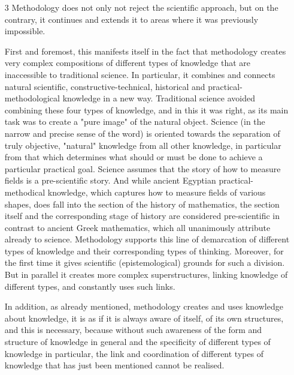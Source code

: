 \documentclass[11pt,a4paper]{article}
\begin{document}
\begin{itemize}
\item[3] Methodology does not only not reject the scientific approach, but on
  the contrary, it continues and extends it to areas where it was previously
  impossible.
  
  First and foremost, this manifests itself in the fact that methodology
  creates very complex compositions of different types of knowledge that are
  inaccessible to traditional science. In particular, it combines and connects
  natural scientific, constructive-technical, historical and
  practical-methodological knowledge in a new way. Traditional science avoided
  combining these four types of knowledge, and in this it was right, as its
  main task was to create a "pure image" of the natural object. Science (in
  the narrow and precise sense of the word) is oriented towards the
  separation of truly objective, "natural" knowledge from all other knowledge,
  in particular from that which determines what should or must be done to
  achieve a particular practical goal. Science assumes that the story of how
  to measure fields is a pre-scientific story. And while ancient Egyptian
  practical-methodical knowledge, which captures how to measure fields of
  various shapes, does fall into the section of the history of mathematics,
  the section itself and the corresponding stage of history are considered
  pre-scientific in contrast to ancient Greek mathematics, which all
  unanimously attribute already to science. Methodology supports this line of
  demarcation of different types of knowledge and their corresponding types
  of thinking. Moreover, for the first time it gives scientific
  (epistemological) grounds for such a division. But in parallel it creates
  more complex superstructures, linking knowledge of different types, and
  constantly uses such links.
  
  In addition, as already mentioned, methodology creates and uses knowledge
  about knowledge, it is as if it is always aware of itself, of its own
  structures, and this is necessary, because without such awareness of the
  form and structure of knowledge in general and the specificity of different
  types of knowledge in particular, the link and coordination of different
  types of knowledge that has just been mentioned cannot be realised.


\end{itemize}
\end{document}
